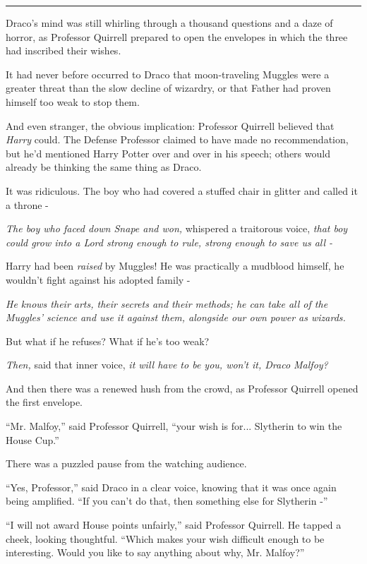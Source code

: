 \begin{center}\rule{3in}{0.4pt}\end{center}

Draco's mind was still whirling through a thousand questions and a daze
of horror, as Professor Quirrell prepared to open the envelopes in which
the three had inscribed their wishes.

It had never before occurred to Draco that moon-traveling Muggles were a
greater threat than the slow decline of wizardry, or that Father had
proven himself too weak to stop them.

And even stranger, the obvious implication: Professor Quirrell believed
that \emph{Harry} could. The Defense Professor claimed to have made no
recommendation, but he'd mentioned Harry Potter over and over in his
speech; others would already be thinking the same thing as Draco.

It was ridiculous. The boy who had covered a stuffed chair in glitter
and called it a throne -

\emph{The boy who faced down Snape and won,} whispered a traitorous
voice, \emph{that boy could grow into a Lord strong enough to rule,
strong enough to save us all -}

Harry had been \emph{raised} by Muggles! He was practically a mudblood
himself, he wouldn't fight against his adopted family -

\emph{He knows their arts, their secrets and their methods; he can take
all of the Muggles' science and use it against them, alongside our own
power as wizards.}

But what if he refuses? What if he's too weak?

\emph{Then,} said that inner voice, \emph{it will have to be you, won't
it, Draco Malfoy?}

And then there was a renewed hush from the crowd, as Professor Quirrell
opened the first envelope.

``Mr. Malfoy,'' said Professor Quirrell, ``your wish is for...
Slytherin to win the House Cup.''

There was a puzzled pause from the watching audience.

``Yes, Professor,'' said Draco in a clear voice, knowing that it was
once again being amplified. ``If you can't do that, then something else
for Slytherin -''

``I will not award House points unfairly,'' said Professor Quirrell. He
tapped a cheek, looking thoughtful. ``Which makes your wish difficult
enough to be interesting. Would you like to say anything about why, Mr.
Malfoy?''


